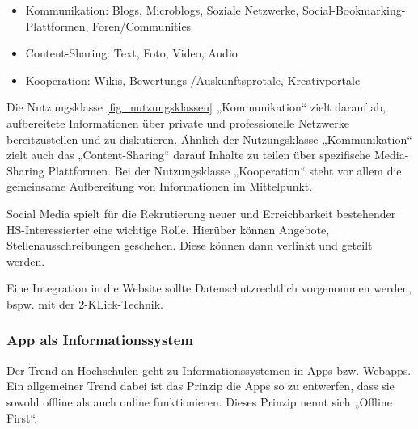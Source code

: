 \begin{itemize}
	\item Kommunikation: Blogs, Microblogs, Soziale Netzwerke, Social-Bookmarking-Plattformen, Foren/Communities
	\item Content-Sharing: Text, Foto, Video, Audio
	\item Kooperation: Wikis, Bewertungs-/Auskunftsprotale, Kreativportale
\end{itemize}

Die Nutzungsklasse \ref{fig_nutzungsklassen} „Kommunikation“ zielt darauf ab, aufbereitete Informationen über private und professionelle Netzwerke bereitzustellen und zu diskutieren.
Ähnlich der Nutzungsklasse „Kommunikation“ zielt auch das „Content-Sharing“ darauf Inhalte zu teilen über spezifische Media-Sharing Plattformen.
Bei der Nutzungsklasse „Kooperation“ steht vor allem die gemeinsame Aufbereitung von Informationen im Mittelpunkt.

Social Media spielt für die Rekrutierung neuer und Erreichbarkeit bestehender HS-Interessierter eine wichtige Rolle. Hierüber können Angebote, Stellenausschreibungen geschehen. Diese können dann verlinkt und geteilt werden. 

Eine Integration in die Website sollte Datenschutzrechtlich vorgenommen werden, bspw. mit der 2-KLick-Technik.




\subsubsection{App als Informationssystem}
\label{android_app_als_is}
Der Trend an Hochschulen geht zu Informationssystemen in Apps bzw. Webapps. Ein allgemeiner Trend dabei ist das Prinzip die Apps so zu entwerfen, dass sie sowohl offline als auch online funktionieren. Dieses Prinzip nennt sich „Offline First“.

